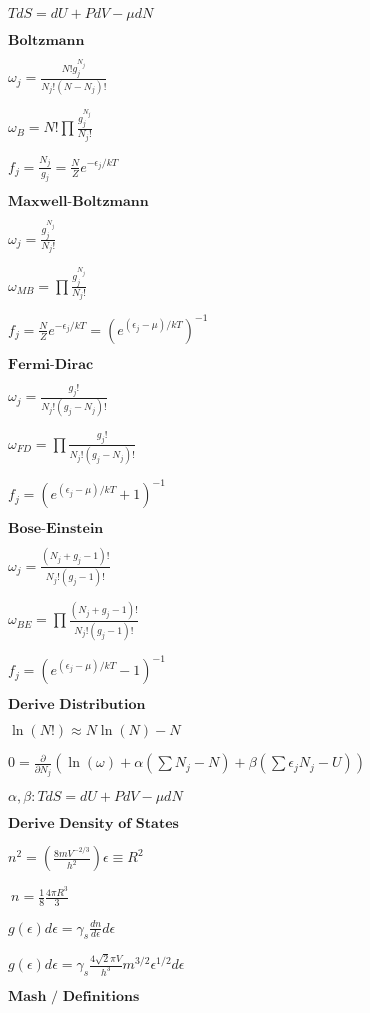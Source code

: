 \documentclass{article}
\author{John Meade}
\begin{document}
\begin{multicols}{3}
\noindent
\fontsize{10}{12}\selectfont

$TdS=dU+PdV-\mu dN$

$\textbf{Boltzmann}$

$\omega_j = \frac{N! g_j^{N_j}}{N_j! (N - N_j)!}$

$\omega_B = N! \prod \frac{g_j^{N_j}}{N_j!}$

$f_j = \frac{N_j}{g_j}=\frac{N}{Z}e^{- \epsilon_j / kT}$

$\textbf{Maxwell-Boltzmann}$

$\omega_j = \frac{g_j^{N_j}}{N_j!}$

$\omega_{MB} = \prod \frac{g_j^{N_j}}{N_j!}$

$f_j=\frac{N}{Z}e^{- \epsilon_j / kT}=(e^{(\epsilon_j-\mu)/kT})^{-1}$

$\textbf{Fermi-Dirac}$

$\omega_j = \frac{g_j!}{N_j! (g_j - N_j)!}$

$\omega_{FD} = \prod \frac{g_j!}{N_j!(g_j - N_j)!}$

$f_j = (e^{(\epsilon_j - \mu)/kT}+1)^{-1}$

$\textbf{Bose-Einstein}$

$\omega_j = \frac{(N_j+g_j-1)!}{N_j!(g_j-1)!}$

$\omega_{BE}=\prod \frac{(N_j+g_j-1)!}{N_j!(g_j-1)!}$

$f_j=(e^{(\epsilon_j - \mu)/kT}-1)^{-1}$

$\textbf{Derive Distribution}$

$\ln(N!) \approx N\ln(N)-N$

$0 = \frac{\partial}{\partial N_j}(\ln(\omega) + \alpha ( \sum N_j - N) + \beta (\sum \epsilon_j N_j - U))$

$\alpha, \beta : TdS=dU+PdV-\mu dN$

$\textbf{Derive Density of States}$

$n^2=\left (\frac{8mV^{-2/3}}{h^2} \right )\epsilon \equiv R^2$

$\:n=\frac{1}{8}\frac{4\pi R^3}{3}$

$g(\epsilon)d\epsilon = \gamma_s \frac{dn}{d\epsilon}d\epsilon$

$g(\epsilon)d\epsilon = \gamma_s \frac{4 \sqrt{2} \pi V}{h^3} m^{3/2}\epsilon^{1/2} d\epsilon$

$\textbf{Mash / Definitions}$


\end{multicols}
\end{document}
